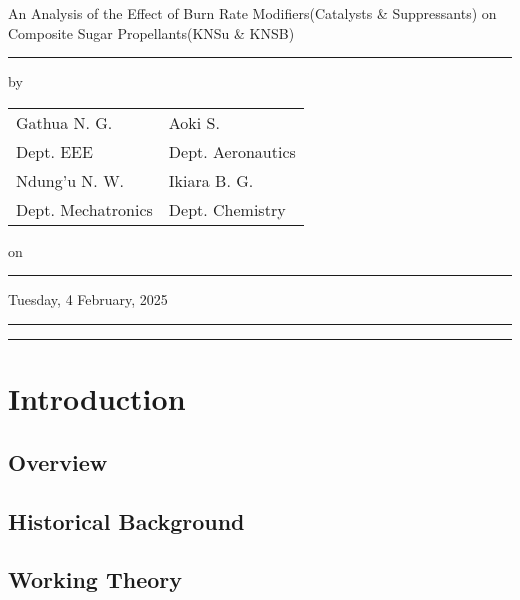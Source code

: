 \documentclass[12pt,letterpaper]{article}
\begin{document}
    \begin{center}
        \huge{An Analysis of the Effect of Burn Rate Modifiers(Catalysts \&
	      Suppressants) on Composite Sugar Propellants(KNSu \& KNSB)}		\\
	\rule{\textwidth}{0em}
       	\normalsize{by}        						        	\\
	\begin{table}[h!]
		\centering
		\begin{tabu}{*2{X[c]}}
			\large{Gathua N. G.} & \large{Aoki S.} 				\\
			\normalsize{Dept. EEE} & \normalsize{Dept. Aeronautics} 	\\
			\large{Ndung'u N. W.} & \large{Ikiara B. G.}			\\
			\normalsize{Dept. Mechatronics} & \normalsize{Dept. Chemistry} 	\\
		\end{tabu}
	\end{table}
        \normalsize{on} 								\\
	\rule{\textwidth}{0em}
        \large{Tuesday, 4 February, 2025}
    \end{center}

    \rule{\textwidth}{0.5pt}
    \begin{abstract}
        \noindent 
    \end{abstract}
    \rule{\textwidth}{0.5pt}
    \tableofcontents
    \listoffigures
    \section{Introduction}
        \subsection{Overview}
                \lipsum[1-2]\cite{barnard2024making}
            \subsection{Historical Background}
                    \lipsum[1-3]\cite{nakka2023chemistry}
        \subsection{Working Theory}
            \lipsum[1-2]\cite{nakka2023knsb}
\end{document}
